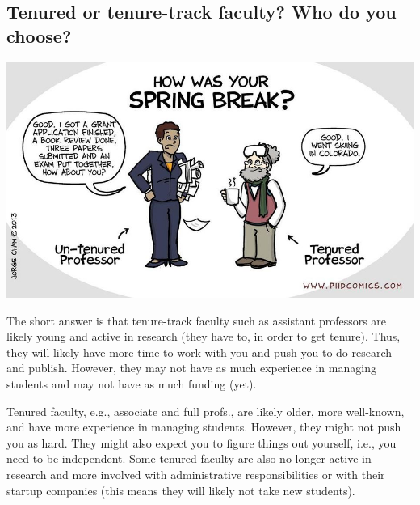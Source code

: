 \documentclass[oneside,11pt]{book}
\newenvironment{commentbox}[1][]{
  \small
  \begin{mybox}
    {\small \textbf{#1}}
  }{
  \end{mybox}
}
\begin{document}
\subsection{Tenured or tenure-track faculty? Who do you choose?}\label{sec:tenure-vs-tenure-track}

\begin{center}
  \includegraphics[scale=0.4]{files/c8.png}
\end{center}


The short answer is that tenure-track faculty such as assistant professors are likely young and active in research (they have to, in order to get tenure). Thus, they will likely have more time to work with you and push you to do research and publish. However, they may not have as much experience in managing students and may not have as much funding (yet).

Tenured faculty, e.g., associate and full profs., are likely older, more well-known, and have more experience in managing students.  However, they might not push you as hard. They might also expect you to figure things out yourself, i.e., you need to be independent.  Some tenured faculty are also no longer active in research and more involved with administrative responsibilities or with their startup companies (this means they will likely not take new students).

\end{document}
